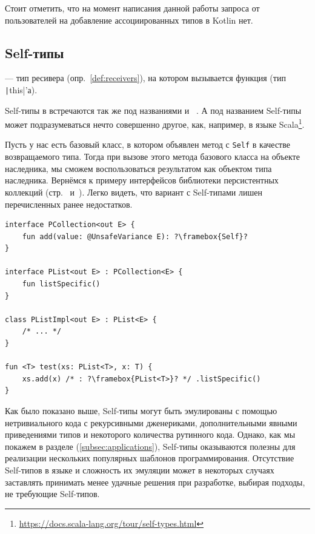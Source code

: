 Стоит отметить, что на момент написания данной работы запроса от пользователей на добавление ассоциированных типов в Kotlin нет.


\subsection{Self-типы} \label{subsec:self-types}

\begin{definition}
    \label{def:self-type}
     --- тип ресивера (опр.~\ref{def:receivers}), на котором вызывается функция (тип \texttt|this|'а).
\end{definition}

Self-типы в встречаются так же под названиями  и ~\cite{ryu2016thistype}.
А под названием Self-типы может подразумеваться нечто совершенно другое, как, например, в языке Scala\footnote{\url{https://docs.scala-lang.org/tour/self-types.html}}.

Пусть у нас есть базовый класс, в котором объявлен метод с \texttt{Self} в качестве возвращаемого типа.
Тогда при вызове этого метода базового класса на объекте наследника, мы сможем воспользоваться результатом как объектом типа наследника.
Вернёмся к примеру интерфейсов библиотеки персистентных коллекций (стр.~\pageref{subsubsec:recursive-generics} и~\pageref{subsubsec:abstract-override}).
Легко видеть, что вариант с Self-типами лишен перечисленных ранее недостатков.

\begin{verbatim}
interface PCollection<out E> {
    fun add(value: @UnsafeVariance E): ?\framebox{Self}?
}

interface PList<out E> : PCollection<E> {
    fun listSpecific()
}

class PListImpl<out E> : PList<E> {
    /* ... */
}

fun <T> test(xs: PList<T>, x: T) {
    xs.add(x) /* : ?\framebox{PList<T>}? */ .listSpecific()
}
\end{verbatim}

Как было показано выше, Self-типы могут быть эмулированы с помощью нетривиального кода с рекурсивными дженериками, дополнительными явными приведениями типов и некоторого количества рутинного кода.
Однако, как мы покажем в разделе (\ref{subsec:applications}), Self-типы оказываются полезны для реализации нескольких популярных шаблонов программирования.
Отсутствие Self-типов в языке и сложность их эмуляции может в некоторых случаях заставлять принимать менее удачные решения при разработке, выбирая подходы, не требующие Self-типов.

